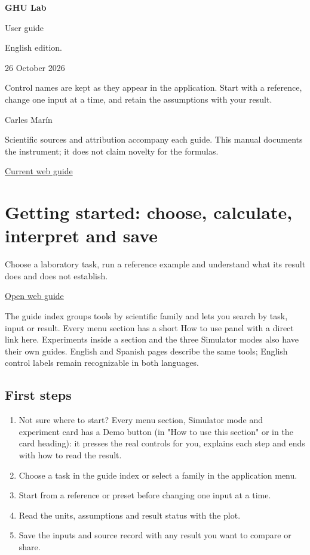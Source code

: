 \documentclass[11pt,a4paper]{article}
\begin{document}
\begin{titlepage}
{\Huge\bfseries GHU Lab\par}
\vspace{12mm}
{\LARGE User guide\par}
\vspace{7mm}
English edition.\par
26 October 2026\par
\vspace{8mm}
Control names are kept as they appear in the application. Start with a reference, change one input at a time, and retain the assumptions with your result.\par
\vfill
Carles Marín\par
Scientific sources and attribution accompany each guide. This manual documents the instrument; it does not claim novelty for the formulas.\par
\href{https://karlesmarin.github.io/ghu-explorer/guide/index.html}{Current web guide}
\end{titlepage}
\tableofcontents
\clearpage
\section{Getting started: choose, calculate, interpret and save}
Choose a laboratory task, run a reference example and understand what its result does and does not establish.

\href{https://karlesmarin.github.io/ghu-explorer/guide/getting-started/index.html}{Open web guide}

The guide index groups tools by scientific family and lets you search by task, input or result. Every menu section has a short How to use panel with a direct link here. Experiments inside a section and the three Simulator modes also have their own guides. English and Spanish pages describe the same tools; English control labels remain recognizable in both languages.
\subsection*{First steps}
\begin{enumerate}
\item Not sure where to start? Every menu section, Simulator mode and experiment card has a  Demo button (in "How to use this section" or in the card heading): it presses the real controls for you, explains each step and ends with how to read the result.
\item Choose a task in the guide index or select a family in the application menu.
\item Start from a reference or preset before changing one input at a time.
\item Read the units, assumptions and result status with the plot.
\item Save the inputs and source record with any result you want to compare or share.
\end{enumerate}
\end{document}
